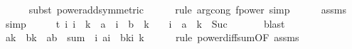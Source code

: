 \begin{isabellebody}
\ \ \ \ \isamarkupfalse%
\ {\isacharparenleft}{\kern0pt}subst\ power{\isacharunderscore}{\kern0pt}add{\isacharbrackleft}{\kern0pt}symmetric{\isacharbrackright}{\kern0pt}{\isacharparenright}{\kern0pt}\isanewline
\ \ \ \ \isamarkupfalse%
\ {\isacharparenleft}{\kern0pt}rule\ arg{\isacharunderscore}{\kern0pt}cong{}{\isacharbrackleft}{\kern0pt}\ f{\isacharequal}{\kern0pt}{\isachardoublequoteopen}power{\isachardoublequoteclose}{\isacharbrackright}{\kern0pt}{\isacharcomma}{\kern0pt}\ simp{\isacharparenright}{\kern0pt}\isanewline
\ \ \ \ \isamarkupfalse%
\ assms{\isacharparenleft}{\kern0pt}{}{\isacharparenright}{\kern0pt}\ \isamarkupfalse%
\ simp\isanewline
\ \ \isamarkupfalse%
\ \isamarkupfalse%
\ t{\isacharcolon}{\kern0pt}\ {\isachardoublequoteopen}{\isasymAnd}i{\isachardot}{\kern0pt}\ i\ {\isacharless}{\kern0pt}\ k\ {\isasymLongrightarrow}\ a\ {\isacharcircum}{\kern0pt}\ i\ {\isacharasterisk}{\kern0pt}\ b\ {\isacharcircum}{\kern0pt}\ {\isacharparenleft}{\kern0pt}k\ {\isacharminus}{\kern0pt}\ {}\ {\isacharminus}{\kern0pt}\ i{\isacharparenright}{\kern0pt}\ {\isasymle}\ a\ {\isacharcircum}{\kern0pt}\ {\isacharparenleft}{\kern0pt}k\ {\isacharminus}{\kern0pt}\ Suc\ {}{\isacharparenright}{\kern0pt}{\isachardoublequoteclose}\isanewline
\ \ \ \ \isamarkupfalse%
\ blast\isanewline
\ \ \isamarkupfalse%
\ {\isachardoublequoteopen}a{\isacharcircum}{\kern0pt}k\ {\isacharminus}{\kern0pt}\ b{\isacharcircum}{\kern0pt}k\ {\isacharequal}{\kern0pt}\ {\isacharparenleft}{\kern0pt}a{\isacharminus}{\kern0pt}b{\isacharparenright}{\kern0pt}\ {\isacharasterisk}{\kern0pt}\ sum\ \ {\isacharparenleft}{\kern0pt}{\isasymlambda}i{\isachardot}{\kern0pt}\ a{\isacharcircum}{\kern0pt}i\ {\isacharasterisk}{\kern0pt}\ b{\isacharcircum}{\kern0pt}{\isacharparenleft}{\kern0pt}k{\isacharminus}{\kern0pt}{}{\isacharminus}{\kern0pt}i{\isacharparenright}{\kern0pt}{\isacharparenright}{\kern0pt}\ {\isacharbraceleft}{\kern0pt}{}{\isachardot}{\kern0pt}{\isachardot}{\kern0pt}{\isacharless}{\kern0pt}k{\isacharbraceright}{\kern0pt}{\isachardoublequoteclose}\isanewline
\ \ \ \ \isamarkupfalse%
\ {\isacharparenleft}{\kern0pt}rule\ power{\isacharunderscore}{\kern0pt}diff{\isacharunderscore}{\kern0pt}sum{\isacharbrackleft}{\kern0pt}OF\ assms{\isacharparenleft}{\kern0pt}{}{\isacharparenright}{\kern0pt}{\isacharbrackright}{\kern0pt}{\isacharparenright}{\kern0pt}\isanewline

\end{isabellebody}
